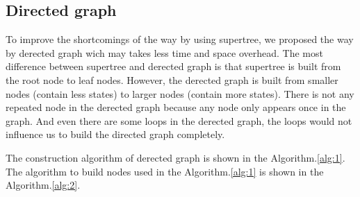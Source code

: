 \subsection{Directed graph}
To improve the shortcomings of the way by using supertree, we proposed the way by derected graph wich may takes less time and space overhead. The most difference between supertree and derected graph is that supertree is built from the root node to leaf nodes. However, the derected graph is built from smaller nodes (contain less states) to larger nodes (contain more states). There is not any repeated node in the derected graph because any node only appears once in the graph. And even there are some loops in the derected graph, the loops would not influence us to build the directed graph completely.

The construction algorithm of derected graph is shown in the Algorithm.\ref{alg:1}. The algorithm to build nodes used in the Algorithm.\ref{alg:1} is shown in the Algorithm.\ref{alg:2}.

